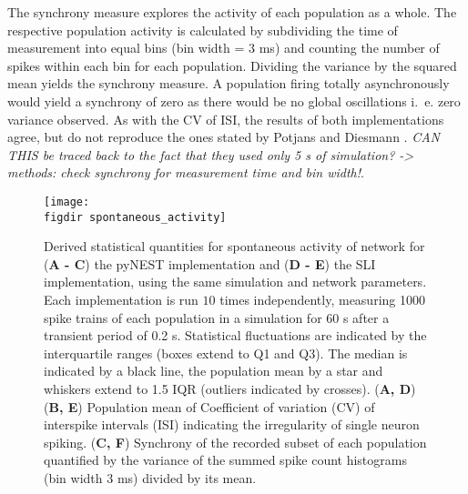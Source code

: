 The synchrony measure explores the activity of each population as a whole. The respective population
activity is calculated by subdividing the time of measurement into equal bins (bin width = $3$ ms) 
and counting the number of spikes within each bin for each population. 
Dividing the variance by the squared mean yields the synchrony measure. 
A population firing totally asynchronously would yield a synchrony of zero as there would 
be no global oscillations i.~e. zero variance observed.
As with the CV of ISI, the results of both implementations agree, but do not reproduce the ones stated 
by Potjans and Diesmann \cite{potjans2014}. \emph{CAN THIS be traced back to the fact that they used 
only 5 s of simulation? -> methods: check synchrony for measurement time and bin width!}. 
\begin{figure}[htpb]
    \centering
    \texttt{[image: \\figdir spontaneous\_activity]}
    \caption{
        Derived statistical quantities for spontaneous activity of network for
        (\textbf{A - C}) the pyNEST implementation and (\textbf{D - E}) the SLI implementation, 
        using the same simulation and network parameters.
        Each implementation is run $10$ times independently, 
        measuring 1000 spike trains of each population in a simulation for 60 s 
        after a transient period of 0.2 s. 
        Statistical fluctuations 
        are indicated by the interquartile ranges (boxes extend to Q1 and Q3). 
        The median is indicated by a black line, the population mean by a star and 
        whiskers extend to 1.5 IQR (outliers indicated by crosses). 
        \quad (\textbf{A, D}) 
        \quad (\textbf{B, E}) Population mean of Coefficient of variation (CV) of interspike intervals (ISI) indicating 
        the irregularity of single neuron spiking. 
        \quad (\textbf{C, F}) Synchrony of the recorded subset of each population quantified by the 
        variance of the summed spike count histograms (bin width 3 ms) divided by
        its mean. 
    }
    \label{fig:spontaneous_activity}
\end{figure}

